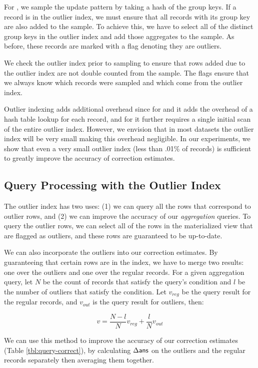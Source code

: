For \aggview, we sample the update pattern by taking a hash of the group keys.
If a record is in the outlier index, we must ensure that all records with its group key are also added to the sample.
To achieve this, we have to select all of the distinct group keys in the outlier index and add those aggregates to the sample.
As before, these records are marked with a flag denoting they are outliers.

We check the outlier index prior to sampling to ensure that rows added due to the outlier index are not double counted from the sample.
The flags ensure that we always know which records were sampled and which come from the outlier index.

Outlier indexing adds additional overhead since for \spview and \fjview it adds the overhead of a hash table lookup for each record, and for \aggview it further requires a single initial scan of the entire outlier index. 
However, we envision that in most datasets the outlier index will be very small making this overhead negligible.
In our experiments, we show that even a very small outlier index (less than .01\% of records) is sufficient to greatly improve the accuracy of
correction estimates.

\subsection{Query Processing with the Outlier Index} 
The outlier index has two uses: (1) we can query all the rows that correspond to outlier rows, 
and (2) we can improve the accuracy of our \emph{aggregation} queries.
To query the outlier rows, we can select all of the rows in the materialized view that are flagged as outliers, and these rows are guaranteed to be up-to-date.

We can also incorporate the outliers into our correction estimates.  
By guaranteeing that certain rows are in the index, we
have to merge two results: one over the outliers and one over the regular records.
For a given aggregation query, let $N$ be the count of records that satisfy the query's condition and $l$ be the number of outliers that satisfy the condition.
Let $v_{reg}$ be the query result for the regular records, and $v_{out}$ is the query result for outliers, then:

\[
 v = \frac{N-l}{N}v_{reg} + \frac{l}{N}v_{out}
\]

We can use this method to improve the accuracy of our correction estimates (Table \ref{tbl:query-correct}), by calculating $\Delta\textsf{ans}$ 
on the outliers and the regular records separately then averaging them together. 
